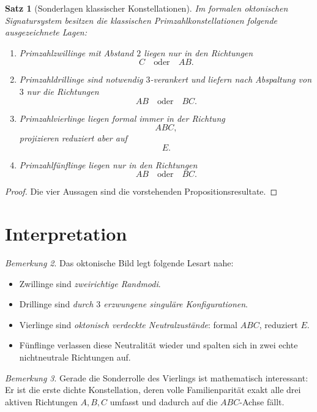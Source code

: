 \documentclass[11pt,a4paper]{article}
\newtheorem{satz}{Satz}
\theoremstyle{definition}
\theoremstyle{remark}
\newtheorem{bemerkung}[satz]{Bemerkung}
\begin{document}
	\begin{satz}[Sonderlagen klassischer Konstellationen]
		Im formalen oktonischen Signatursystem besitzen die klassischen Primzahlkonstellationen
		folgende ausgezeichnete Lagen:
		\begin{enumerate}[label=\textup{(\roman*)}]
			\item Primzahlzwillinge mit Abstand \(2\) liegen nur in den Richtungen
			\[
			C \quad\text{oder}\quad AB.
			\]
			\item Primzahldrillinge sind notwendig \(3\)-verankert und liefern nach Abspaltung von \(3\)
			nur die Richtungen
			\[
			AB \quad\text{oder}\quad BC.
			\]
			\item Primzahlvierlinge liegen formal immer in der Richtung
			\[
			ABC,
			\]
			projizieren reduziert aber auf
			\[
			E.
			\]
			\item Primzahlfünflinge liegen nur in den Richtungen
			\[
			AB \quad\text{oder}\quad BC.
			\]
		\end{enumerate}
	\end{satz}
	
	\begin{proof}
		Die vier Aussagen sind die vorstehenden Propositionsresultate.
	\end{proof}
	
	\section{Interpretation}
	
	\begin{bemerkung}
		Das oktonische Bild legt folgende Lesart nahe:
		\begin{itemize}[itemsep=0.2em]
			\item Zwillinge sind \emph{zweirichtige Randmodi}.
			\item Drillinge sind \emph{durch \(3\) erzwungene singuläre Konfigurationen}.
			\item Vierlinge sind \emph{oktonisch verdeckte Neutralzustände}: formal \(ABC\), reduziert \(E\).
			\item Fünflinge verlassen diese Neutralität wieder und spalten sich in zwei echte
			nichtneutrale Richtungen auf.
		\end{itemize}
	\end{bemerkung}
	
	\begin{bemerkung}
		Gerade die Sonderrolle des Vierlings ist mathematisch interessant: Er ist die erste dichte
		Konstellation, deren volle Familienparität exakt alle drei aktiven Richtungen \(A,B,C\)
		umfasst und dadurch auf die \(ABC\)-Achse fällt.
	\end{bemerkung}
	
\end{document}

